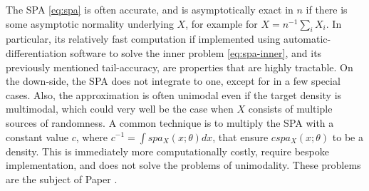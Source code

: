 The SPA \eqref{eq:spa} is often accurate, and is asymptotically exact in $n$ if there is some asymptotic normality underlying $X$, for example for $X=n^{-1}\sum_i X_i$.
In particular, its relatively fast computation if implemented using automatic-differentiation software to solve the inner problem \eqref{eq:spa-inner}, and its previously mentioned tail-accuracy, are properties that are highly tractable.
On the down-side, the SPA does not integrate to one, except for in a few special cases.
Also, the approximation is often unimodal even if the target density is multimodal, which could very well be the case when $X$ consists of multiple sources of randomness.
A common technique is to multiply the SPA with a constant value $c$, where $c^{-1}=\int spa_X(x;\theta)dx$, that ensure $cspa_X(x;\theta)$ to be a density.
This is immediately more computationally costly, require bespoke implementation, and does not solve the problems of unimodality. 
These problems are the subject of Paper .






